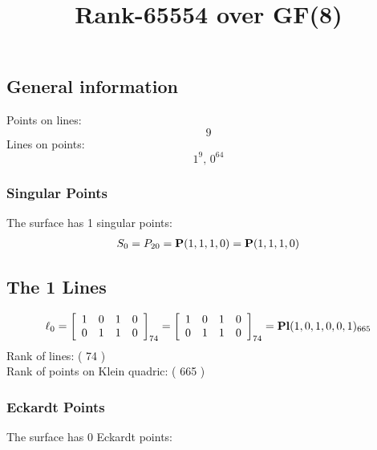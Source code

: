 \documentclass{article}
\newcommand\setTBstruts{\def\T{\rule{0pt}{2.6ex}}%
\def\B{\rule[-1.2ex]{0pt}{0pt}}}
\newcommand{\bP}{{\bf P}}
\begin{document}
 
\setTBstruts



{\allowdisplaybreaks%






\title{Rank-65554 over GF(8)}
\author{}%
\maketitle%
%
{}



\subsection*{General information}
Points on lines:
$$
9$$
Lines on points:
$$
1^9,\,0^{64}$$
\subsubsection*{Singular Points}
The surface has 1 singular points:\\
\begin{align*}
S_{0} &= P_{20}=\bP(1, 1, 1, 0) = \bP(1, 1, 1, 0)\\
\end{align*}
\subsection*{The 1 Lines}
$$
\ell_{0} = 
\left[
\begin{array}{*{4}{r}}
1 & 0 & 1 & 0\\
0 & 1 & 1 & 0\\
\end{array}
\right]
_{74}
=
\left[
\begin{array}{*{4}c}
1  & 0  & 1  & 0\\
0  & 1  & 1  & 0\\
\end{array}
\right]_{74}
={\rm\bf Pl}(1,0,1,0,0,1 )_{665}$$
Rank of lines: ( 74 )\\
Rank of points on Klein quadric: ( 665 )\\
\subsubsection*{Eckardt Points}
The surface has 0 Eckardt points:\\
}
\end{document}
